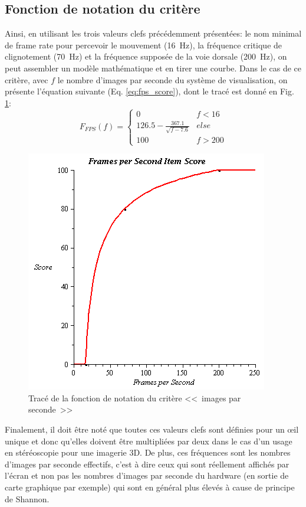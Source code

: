 	\subsection{Fonction de notation du critère}
	\par Ainsi, en utilisant les trois valeurs clefs précédemment présentées: le nom minimal de frame rate pour percevoir le mouvement (16~Hz), la fréquence critique de clignotement (70~Hz) et la fréquence supposée de la voie dorsale (200~Hz), on peut assembler un modèle mathématique et en tirer une courbe. Dans le cas de ce critère, avec $f$ le nombre d'images par seconde du système de visualisation, on présente l'équation suivante (Eq. \ref{eq:fps_score}), dont le tracé est donné en Fig. \ref{fig:score_fps}:
	\begin{equation}
		F_{FPS}(f) = \begin{cases}
		0 & f < 16\\
		126.5 - \frac{367.1}{\sqrt{f - 7.6}} & else\\
		100 & f > 200
		\end{cases}
		\label{eq:fps_score}
	\end{equation}

	\begin{figure}
		\centering
		\includegraphics[scale=.75]{Figures/FPS}
		\caption{Tracé de la fonction de notation du critère <<~images par seconde~>>}
		\label{fig:score_fps}
	\end{figure}

	\par Finalement, il doit être noté que toutes ces valeurs clefs sont définies pour un œil unique et donc qu'elles doivent être multipliées par deux dans le cas d'un usage en stéréoscopie pour une imagerie 3D. De plus, ces fréquences sont les nombres d'images par seconde effectifs, c'est à dire ceux qui sont réellement affichés par l'écran et non pas les nombres d'images par seconde du hardware (en sortie de carte graphique par exemple) qui sont en général plus élevés à cause de principe de Shannon.
	
